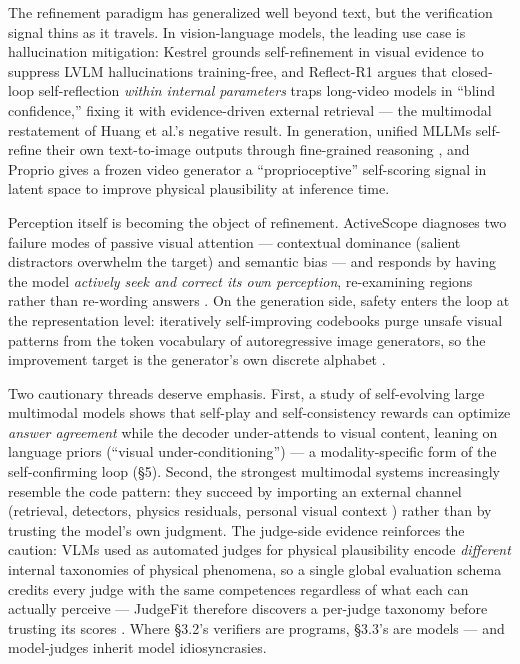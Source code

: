 \documentclass[
  11pt,
]{article}
\begin{document}
The refinement paradigm has generalized well beyond text, but the
verification signal thins as it travels. In vision-language models, the
leading use case is hallucination mitigation: Kestrel
\citep{mao2026kestrel} grounds self-refinement in visual evidence to
suppress LVLM hallucinations training-free, and Reflect-R1
\citep{chen2026reflect} argues that closed-loop self-reflection
\emph{within internal parameters} traps long-video models in ``blind
confidence,'' fixing it with evidence-driven external retrieval --- the
multimodal restatement of Huang et al.'s negative result. In generation,
unified MLLMs self-refine their own text-to-image outputs through
fine-grained reasoning \citep{kim2026fire}, and Proprio
\citep{hassan2026proprio} gives a frozen video generator a
``proprioceptive'' self-scoring signal in latent space to improve
physical plausibility at inference time.

Perception itself is becoming the object of refinement. ActiveScope
diagnoses two failure modes of passive visual attention --- contextual
dominance (salient distractors overwhelm the target) and semantic bias
--- and responds by having the model \emph{actively seek and correct its
own perception}, re-examining regions rather than re-wording answers
\citep{wang2026activescope}. On the generation side, safety enters the
loop at the representation level: iteratively self-improving codebooks
purge unsafe visual patterns from the token vocabulary of autoregressive
image generators, so the improvement target is the generator's own
discrete alphabet \citep{xue2026safe}.

Two cautionary threads deserve emphasis. First, a study of self-evolving
large multimodal models \citep{venkatraman2026paying} shows that
self-play and self-consistency rewards can optimize \emph{answer
agreement} while the decoder under-attends to visual content, leaning on
language priors (``visual under-conditioning'') --- a modality-specific
form of the self-confirming loop (§5). Second, the strongest multimodal
systems increasingly resemble the code pattern: they succeed by
importing an external channel (retrieval, detectors, physics residuals,
personal visual context \citep{xue2026personal}) rather than by trusting
the model's own judgment. The judge-side evidence reinforces the
caution: VLMs used as automated judges for physical plausibility encode
\emph{different} internal taxonomies of physical phenomena, so a single
global evaluation schema credits every judge with the same competences
regardless of what each can actually perceive --- JudgeFit therefore
discovers a per-judge taxonomy before trusting its scores
\citep{cao2026each}. Where §3.2's verifiers are programs, §3.3's are
models --- and model-judges inherit model idiosyncrasies.
\end{document}
